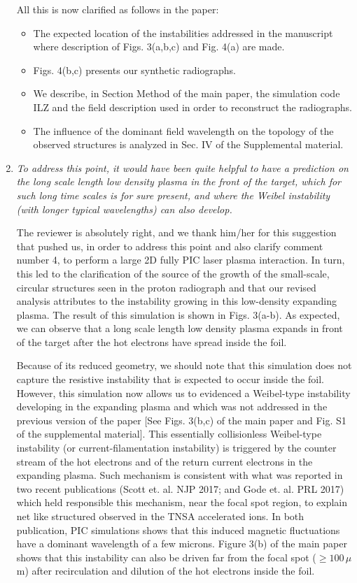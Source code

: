 \documentclass{article}
\begin{document}
\begin{enumerate}
All this is now clarified as follows in the paper:
\begin{itemize}
    \item The expected location of the instabilities addressed in the manuscript where description of  Figs. 3(a,b,c) and Fig. 4(a) are made.
    \item Figs. 4(b,c) presents our synthetic radiographs.
    \item We describe,  in Section Method of the main paper,  the simulation code ILZ and the field description used in order to reconstruct the radiographs.
    \item The influence of the dominant field wavelength on the topology of the observed structures is analyzed in Sec. IV of the Supplemental material. 
\end{itemize}

\item \textit{To address this point, it would have been quite helpful to have a prediction on the long scale length low density plasma in the front of the target, which for such long time scales is for sure present, and where the Weibel instability (with longer typical wavelengths) can also develop. }

The reviewer is absolutely right, and we thank him/her for this suggestion that pushed us, in order to address this point and also clarify comment number 4, to perform a large 2D fully  PIC laser plasma interaction. In turn, this led to the clarification of the source of the growth of the small-scale, circular structures seen in the proton radiograph and that our revised analysis attributes to the instability growing in this low-density expanding plasma.
The result of this simulation is shown in Figs. 3(a-b). As expected, we can observe that a long scale length low density plasma expands in front of the target after the hot electrons have spread inside the foil.

Because of its reduced geometry, we should note that this simulation does not capture the resistive instability that is expected to occur inside the foil. However, this simulation now allows us to evidenced a Weibel-type instability developing in the expanding plasma and which  was not addressed in the previous version of the paper [See Figs. 3(b,c) of the main paper and Fig. S1 of the supplemental material].
This essentially collisionless Weibel-type instability (or current-filamentation instability) is triggered by the counter stream of the hot electrons and of the  return current electrons in the expanding plasma. 
Such mechanism is consistent with what was reported in two recent publications (Scott et. al. NJP 2017; and Gode et. al. PRL 2017) which  held responsible this mechanism, near the focal spot region, to explain net like structured observed in the TNSA accelerated ions. In both publication, PIC simulations shows that this induced magnetic fluctuations  have a dominant wavelength of a few microns.
Figure 3(b) of the main paper shows that this instability can also be driven far from the focal spot ($\ge 100\, \mu$m) after recirculation and dilution  of the hot electrons  inside the foil.


\end{enumerate}
\end{document}
